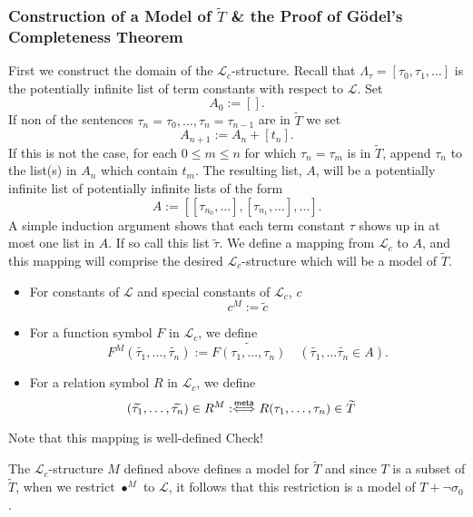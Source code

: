 \subsubsection{Construction of a Model of $\widetilde{T}$ \& the Proof of Gödel's Completeness Theorem}
First we construct the domain of the $\mathcal{L}_c$-structure. Recall that $\Lambda_\tau=[\tau_0,\tau_1,\dots]$ is the potentially infinite list of term constants with respect to $\mathcal{L}$. Set 
$$
    A_0 := [].
$$
If non of the sentences $\tau_n=\tau_0,\dots,\tau_n=\tau_{n-1}$ are in $\widetilde{T}$ we set 
$$A_{n+1}:= A_n+[t_n].$$
If this is not the case, for each $0\leq m\leq n $ for which $\tau_n = \tau_m$ is in $\widetilde{T}$, append $\tau_n$ to the list(s) in $A_n$ which contain $t_m$. The resulting list, $A$, will be a potentially infinite list of potentially infinite lists of the form 
$$A := [[\tau_{n_0},\dots],[\tau_{n_1},\dots],\dots].$$
A simple induction argument shows that each term constant $\tau$ shows up in at most one list in $A$. If so call this list $\widetilde{\tau}$. We define a mapping from $\mathcal{L}_c$ to $A$, and this mapping will comprise the desired $\mathcal{L}_c$-structure which will be a model of $\widetilde{T}$. 
\begin{itemize}
    \item For constants of $\mathcal{L}$ and special constants of $\mathcal{L}_c$, $c$
    $$
        c^M := \widetilde{c}
    $$ 
    \item For a function symbol $F$ in $\mathcal{L}_c$, we define
    $$
        F^M(\widetilde{\tau_1},\dots,\widetilde{\tau_n}) := \widetilde{F(\tau_1,\dots,\tau_n)} \quad \left(\widetilde{\tau_1},\dots\widetilde{\tau_n}\in A\right).
    $$
    \item For a relation symbol $R$ in $\mathcal{L}_c$, we define 
    $$
        (\widetilde{\tau_1},\dots,\widetilde{\tau_n})\in R^M  :\mathrel{\overset{\mathsf{meta}}{\Longleftrightarrow}} R(\tau_1,\dots,\tau_n)\in \widetilde{T} \quad 
    $$ 
\end{itemize}   
\begin{remark}
    Note that this mapping is well-defined {\Large Check!}
\end{remark}
\begin{theorem}
    The $\mathcal{L}_c$-structure $M$ defined above defines a model for $\widetilde{T}$ and since $T$ is a subset of $\widetilde{T}$, when we restrict $\bullet^M$ to $\mathcal{L}$, it follows that this restriction is a model of $T+\neg\sigma_0$. 
\end{theorem}
